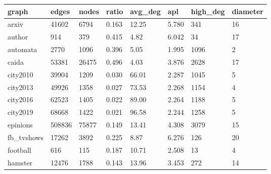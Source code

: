 		\begin{longtable}[c]{|l|l|l|l|l|l|l|l|}
			\hline
			\textbf{graph}      & \textbf{edges} & \textbf{nodes} & \textbf{ratio} & \textbf{avg\_deg} & \textbf{apl} & \textbf{high\_deg} & \textbf{diameter} \\ \hline
			\endfirsthead
			\endhead
			arxiv               & 41602          & 6794           & 0.163          & 12.25             & 5.780        & 341                & 16                \\ \hline
			author              & 914            & 379            & 0.415          & 4.82              & 6.042        & 34                 & 17                \\ \hline
			automata            & 2770           & 1096           & 0.396          & 5.05              & 1.995        & 1096               & 2                 \\ \hline
			caida               & 53381          & 26475          & 0.496          & 4.03              & 3.876        & 2628               & 17                \\ \hline
			city2010            & 39904          & 1209           & 0.030          & 66.01             & 2.287        & 1045               & 5                 \\ \hline
			city2013            & 49926          & 1358           & 0.027          & 73.53             & 2.268        & 1154               & 4                 \\ \hline
			city2016            & 62523          & 1405           & 0.022          & 89.00             & 2.264        & 1188               & 5                 \\ \hline
			city2019            & 68668          & 1422           & 0.021          & 96.58             & 2.244        & 1258               & 5                 \\ \hline
			epinions            & 508836         & 75877          & 0.149          & 13.41             & 4.308        & 3079               & 15                \\ \hline
			fb\_tvshows         & 17262          & 3892           & 0.225          & 8.87              & 6.276        & 126                & 20                \\ \hline
			football            & 616            & 115            & 0.187          & 10.71             & 2.508        & 13                 & 4                 \\ \hline
			hamster             & 12476          & 1788           & 0.143          & 13.96             & 3.453        & 272                & 14                \\ \hline

\end{longtable}

